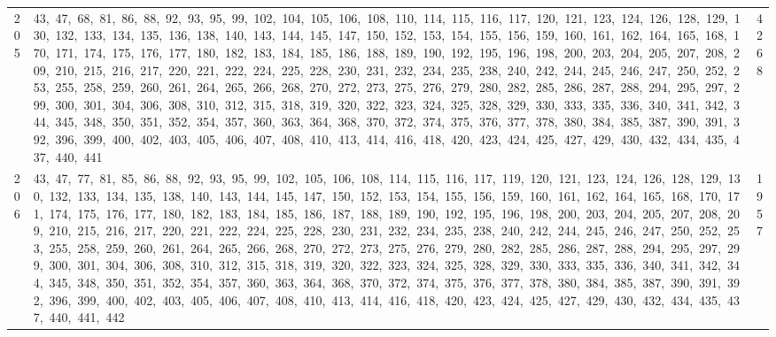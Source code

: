 \begin{longtable}{c|p{}|r}
205 & 43,\ 47,\ 68,\ 81,\ 86,\ 88,\ 92,\ 93,\ 95,\ 99,\ 102,\ 104,\ 105,\ 106,\ 108,\ 110,\ 114,\ 115,\ 116,\ 117,\ 120,\ 121,\ 123,\ 124,\ 126,\ 128,\ 129,\ 130,\ 132,\ 133,\ 134,\ 135,\ 136,\ 138,\ 140,\ 143,\ 144,\ 145,\ 147,\ 150,\ 152,\ 153,\ 154,\ 155,\ 156,\ 159,\ 160,\ 161,\ 162,\ 164,\ 165,\ 168,\ 170,\ 171,\ 174,\ 175,\ 176,\ 177,\ 180,\ 182,\ 183,\ 184,\ 185,\ 186,\ 188,\ 189,\ 190,\ 192,\ 195,\ 196,\ 198,\ 200,\ 203,\ 204,\ 205,\ 207,\ 208,\ 209,\ 210,\ 215,\ 216,\ 217,\ 220,\ 221,\ 222,\ 224,\ 225,\ 228,\ 230,\ 231,\ 232,\ 234,\ 235,\ 238,\ 240,\ 242,\ 244,\ 245,\ 246,\ 247,\ 250,\ 252,\ 253,\ 255,\ 258,\ 259,\ 260,\ 261,\ 264,\ 265,\ 266,\ 268,\ 270,\ 272,\ 273,\ 275,\ 276,\ 279,\ 280,\ 282,\ 285,\ 286,\ 287,\ 288,\ 294,\ 295,\ 297,\ 299,\ 300,\ 301,\ 304,\ 306,\ 308,\ 310,\ 312,\ 315,\ 318,\ 319,\ 320,\ 322,\ 323,\ 324,\ 325,\ 328,\ 329,\ 330,\ 333,\ 335,\ 336,\ 340,\ 341,\ 342,\ 344,\ 345,\ 348,\ 350,\ 351,\ 352,\ 354,\ 357,\ 360,\ 363,\ 364,\ 368,\ 370,\ 372,\ 374,\ 375,\ 376,\ 377,\ 378,\ 380,\ 384,\ 385,\ 387,\ 390,\ 391,\ 392,\ 396,\ 399,\ 400,\ 402,\ 403,\ 405,\ 406,\ 407,\ 408,\ 410,\ 413,\ 414,\ 416,\ 418,\ 420,\ 423,\ 424,\ 425,\ 427,\ 429,\ 430,\ 432,\ 434,\ 435,\ 437,\ 440,\ 441 & 4268 \\
206 & 43,\ 47,\ 77,\ 81,\ 85,\ 86,\ 88,\ 92,\ 93,\ 95,\ 99,\ 102,\ 105,\ 106,\ 108,\ 114,\ 115,\ 116,\ 117,\ 119,\ 120,\ 121,\ 123,\ 124,\ 126,\ 128,\ 129,\ 130,\ 132,\ 133,\ 134,\ 135,\ 138,\ 140,\ 143,\ 144,\ 145,\ 147,\ 150,\ 152,\ 153,\ 154,\ 155,\ 156,\ 159,\ 160,\ 161,\ 162,\ 164,\ 165,\ 168,\ 170,\ 171,\ 174,\ 175,\ 176,\ 177,\ 180,\ 182,\ 183,\ 184,\ 185,\ 186,\ 187,\ 188,\ 189,\ 190,\ 192,\ 195,\ 196,\ 198,\ 200,\ 203,\ 204,\ 205,\ 207,\ 208,\ 209,\ 210,\ 215,\ 216,\ 217,\ 220,\ 221,\ 222,\ 224,\ 225,\ 228,\ 230,\ 231,\ 232,\ 234,\ 235,\ 238,\ 240,\ 242,\ 244,\ 245,\ 246,\ 247,\ 250,\ 252,\ 253,\ 255,\ 258,\ 259,\ 260,\ 261,\ 264,\ 265,\ 266,\ 268,\ 270,\ 272,\ 273,\ 275,\ 276,\ 279,\ 280,\ 282,\ 285,\ 286,\ 287,\ 288,\ 294,\ 295,\ 297,\ 299,\ 300,\ 301,\ 304,\ 306,\ 308,\ 310,\ 312,\ 315,\ 318,\ 319,\ 320,\ 322,\ 323,\ 324,\ 325,\ 328,\ 329,\ 330,\ 333,\ 335,\ 336,\ 340,\ 341,\ 342,\ 344,\ 345,\ 348,\ 350,\ 351,\ 352,\ 354,\ 357,\ 360,\ 363,\ 364,\ 368,\ 370,\ 372,\ 374,\ 375,\ 376,\ 377,\ 378,\ 380,\ 384,\ 385,\ 387,\ 390,\ 391,\ 392,\ 396,\ 399,\ 400,\ 402,\ 403,\ 405,\ 406,\ 407,\ 408,\ 410,\ 413,\ 414,\ 416,\ 418,\ 420,\ 423,\ 424,\ 425,\ 427,\ 429,\ 430,\ 432,\ 434,\ 435,\ 437,\ 440,\ 441,\ 442 & 1957 \\

\end{longtable}
